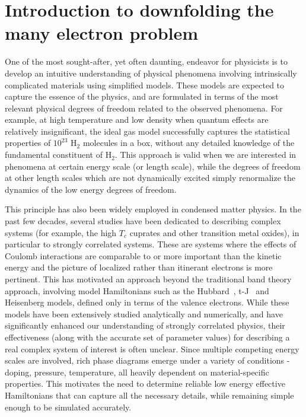 \documentclass[prl,12pt,onecolumn,nofootinbib,notitlepage,english,superscriptaddress]{revtex4-1}
\begin{document}
\section{Introduction to downfolding the many electron problem}

One of the most sought-after, yet often daunting, endeavor for physicists is to develop 
an intuitive understanding of physical phenomena involving intrinsically complicated materials 
using simplified models. These models are expected to capture the essence of the physics, and are formulated in terms 
of the most relevant physical degrees of freedom related to the observed phenomena. 
For example, at high temperature and low density when quantum effects are relatively insignificant, the ideal gas model 
successfully captures the statistical properties of $10^{23}$ H$_{2}$ molecules in a box, 
without any detailed knowledge of the fundamental constituent of H$_{2}$. This approach is valid when we are interested in 
phenomena at certain energy scale (or length scale), while the degrees of freedom at other length scales which are not 
dynamically excited simply renormalize the dynamics of the low energy degrees of freedom. 

This principle has also been widely employed in condensed matter physics. In the past few decades, several studies 
have been dedicated to describing complex systems (for example, the high $T_c$ cuprates and other transition metal oxides), 
in particular to strongly correlated systems. These are systems where the effects of Coulomb 
interactions are comparable to or more important than the kinetic energy and the picture of 
localized rather than itinerant electrons is more pertinent. This has motivated an approach beyond the 
traditional band theory approach, involving model Hamiltonians such as the Hubbard~\cite{Hubbard}, t-J~\cite{tJSpalek} 
and Heisenberg models, defined only in terms of the valence electrons. 
While these models have been extensively studied analytically and numerically, and have significantly 
enhanced our understanding of strongly correlated physics, their effectiveness 
(along with the accurate set of parameter values) for describing a real complex system of interest is often unclear. Since multiple 
competing energy scales are involved, rich phase diagrams emerge under a variety of conditions - doping, pressure, 
temperature, all heavily dependent on material-specific properties. This motivates 
the need to determine reliable low energy effective Hamiltonians that can capture all the necessary details, while 
remaining simple enough to be simulated accurately.  
\end{document}
